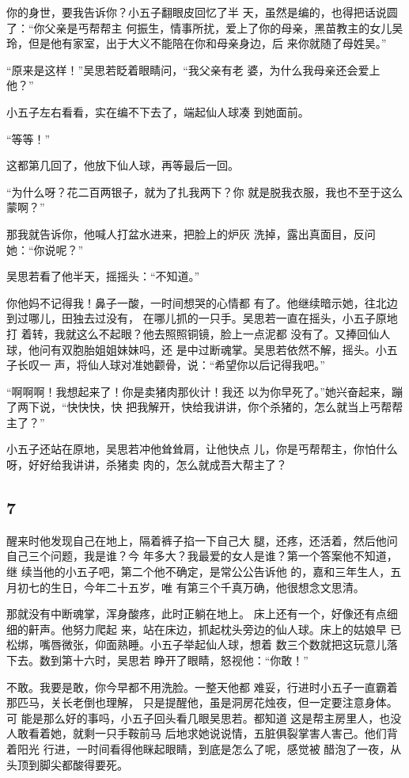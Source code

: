 你的身世，要我告诉你？小五子翻眼皮回忆了半
天，虽然是编的，也得把话说圆了：“你父亲是丐帮帮主
何振生，情事所扰，爱上了你的母亲，黑苗教主的女儿吴
玲，但是他有家室，出于大义不能陪在你和母亲身边，后
来你就随了母姓吴。”

“原来是这样！”吴思若眨着眼睛问，“我父亲有老
婆，为什么我母亲还会爱上他？”

小五子左右看看，实在编不下去了，端起仙人球凑
到她面前。

“等等！”

这都第几回了，他放下仙人球，再等最后一回。

“为什么呀？花二百两银子，就为了扎我两下？你
就是脱我衣服，我也不至于这么蒙啊？”

那我就告诉你，他喊人打盆水进来，把脸上的炉灰
洗掉，露出真面目，反问她：“你说呢？”

吴思若看了他半天，摇摇头：“不知道。”

你他妈不记得我！鼻子一酸，一时间想哭的心情都
有了。他继续暗示她，往北边到过哪儿，田独去过没有，
在哪儿抓的一只手。吴思若一直在摇头，小五子原地打
着转，我就这么不起眼？他去照照铜镜，脸上一点泥都
没有了。又捧回仙人球，他问有双胞胎姐姐妹妹吗，还
是中过断魂掌。吴思若依然不解，摇头。小五子长叹一
声，将仙人球对准她颧骨，说：“希望你以后记得我吧。”

“啊啊啊！我想起来了！你是卖猪肉那伙计！我还
以为你早死了。”她兴奋起来，蹦了两下说，“快快快，快
把我解开，快给我讲讲，你个杀猪的，怎么就当上丐帮帮
主了？”

小五子还站在原地，吴思若冲他耸耸肩，让他快点
儿，你是丐帮帮主，你怕什么呀，好好给我讲讲，杀猪卖
肉的，怎么就成吾大帮主了？
\newline

{\centering\subsection{7}}

醒来时他发现自己在地上，隔着裤子掐一下自己大
腿，还疼，还活着，然后他问自己三个问题，我是谁？今
年多大？我最爱的女人是谁？第一个答案他不知道，继
续当他的小五子吧，第二个他不确定，是常公公告诉他
的，嘉和三年生人，五月初七的生日，今年二十五岁，唯
有第三个千真万确，他很想念文思清。

那就没有中断魂掌，浑身酸疼，此时正躺在地上。
床上还有一个，好像还有点细细的鼾声。他努力爬起
来，站在床边，抓起枕头旁边的仙人球。床上的姑娘早
已松绑，嘴唇微张，仰面熟睡。小五子举起仙人球，想着
数三个数就把这玩意儿落下去。数到第十六时，吴思若
睁开了眼睛，怒视他：“你敢！”

不敢。我要是敢，你今早都不用洗脸。一整天他都
难妥，行进时小五子一直霸着那匹马，关长老倒也理解，
只是提醒他，虽是洞房花烛夜，但一定要注意身体。可
能是那么好的事吗，小五子回头看几眼吴思若。都知道
这是帮主房里人，也没人敢看着她，就剩一只手鞍前马
后地求她说说情，五脏俱裂掌害人害己。他们背着阳光
行进，一时间看得他眯起眼睛，到底是怎么了呢，感觉被
醋泡了一夜，从头顶到脚尖都酸得要死。

